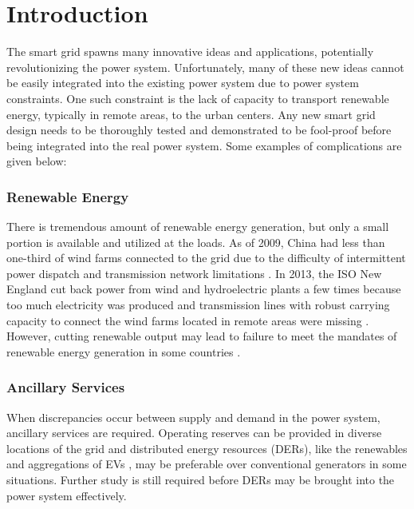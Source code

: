 \documentclass[journal]{IEEEtran}
\begin{document}
\IEEEpeerreviewmaketitle

\section{Introduction}

The smart grid spawns many innovative ideas and applications, potentially revolutionizing the power system. Unfortunately, many of these new ideas cannot be easily integrated into the existing power system  due to power system constraints. One such constraint is the lack of capacity to transport renewable energy, typically in remote areas, to the urban centers. Any new smart grid design needs to be thoroughly tested and demonstrated to be fool-proof  before being integrated into the real power system. Some examples of complications are given below:

\subsubsection{Renewable Energy}
There is tremendous amount of renewable energy generation, but only a small portion is available and  utilized at the loads.  As of 2009, China had less than one-third of wind farms connected to the grid due to the difficulty of intermittent power dispatch and transmission network limitations \cite{ChinaRenewable}. In 2013, the ISO New England cut back power from wind and hydroelectric plants a few times because too much electricity was produced and transmission lines with robust carrying capacity  to connect the wind farms  located in remote areas were missing \cite{intermittentNature}. 
However, cutting  renewable output may lead to failure to meet the mandates of renewable energy generation in some countries \cite{futurePower}.

\subsubsection{Ancillary Services}
When discrepancies occur between supply and demand in the power system, ancillary services are required. Operating reserves can be provided in diverse locations of the grid and distributed energy resources (DERs), like the renewables and aggregations of EVs \cite{regulation_TSG}, may be  preferable over conventional generators in some situations. Further study is still required before  DERs may be brought into the power system effectively.
\end{document}

